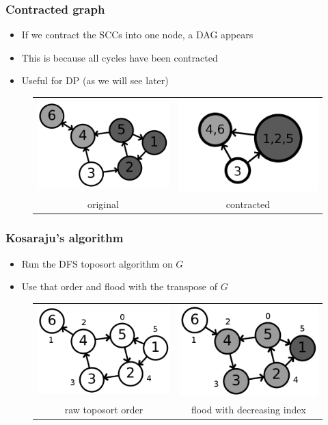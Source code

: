 \documentclass[12pt]{beamer}
\begin{document}
\begin{frame}
\frametitle{Contracted graph}
\begin{itemize}
\item If we contract the SCCs into one node, a DAG appears
\item This is because all cycles have been contracted
\item Useful for DP (as we will see later)
\end{itemize}
\begin{figure}
\centering
\begin{tabular}{cc}
\includegraphics[width=0.4\linewidth]{img/6n-scc}
& \includegraphics[width=0.4\linewidth]{img/6n-contracted} \\
original & contracted
\end{tabular}
\end{figure}
\end{frame}

\begin{frame}
\frametitle{Kosaraju's algorithm}
\begin{itemize}
\item Run the DFS toposort algorithm on $G$
\item Use that order and flood with the transpose of $G$
\end{itemize}
\begin{figure}
\centering
\begin{tabular}{cc}
\includegraphics[width=0.4\linewidth]{img/6n-kosa1}
& \includegraphics[width=0.4\linewidth]{img/6n-kosa2} \\
raw toposort order & flood with decreasing index
\end{tabular}
\end{figure}
\end{frame}
\end{document}
